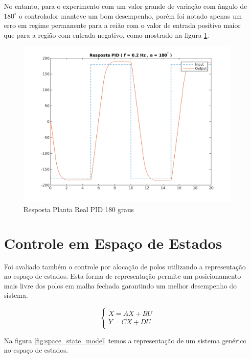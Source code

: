 \documentclass[a4paper,11pt]{article}
\begin{document}
No entanto, para o experimento com um valor grande de variação com ângulo de $180^\circ$ o controlador manteve um bom desempenho, porém foi notado apenas um erro em regime permanente para a reião com o valor de entrada positivo maior que para a região com entrada negativo, como mostrado na figura \ref{fig:quanserpid_s180num5}.

\begin{figure}[H]
    \centering
    \includegraphics[width=0.8\linewidth]{tex/img/quanserpid_s180num5.png}
    \caption{Resposta Planta Real PID 180 graus}
    \label{fig:quanserpid_s180num5}
\end{figure}

\section{Controle em Espaço de Estados}

Foi avaliado também o controle por alocação de polos utilizando a representação no espaço de estados. Esta forma de representação permite um posicionamento mais livre dos polos em malha fechada garantindo um melhor desempenho do sistema.

\begin{equation}
\left\{
\begin{array}{c}
    \dot{X} = A X + B U \\
    Y = C X + D U \\
\end{array}
\right.
\end{equation}

Na figura \ref{fig:space_state_model} temos a representação de um sistema genérico no espaço de estados.
\end{document}
